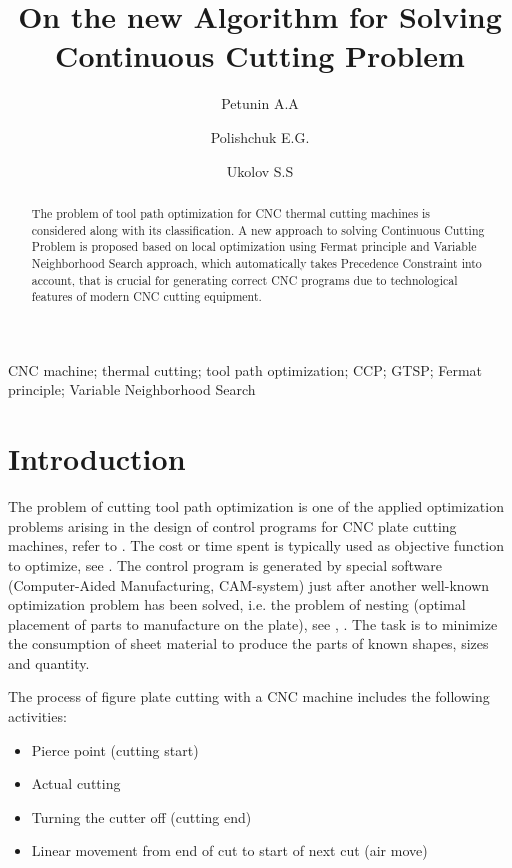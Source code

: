 \documentclass{ifacconf}
\begin{document}
\begin{frontmatter}

\title{On the new Algorithm for Solving Continuous Cutting Problem}

\author[urfu]{Petunin A.A}
\author[urfu]{Polishchuk E.G.}
\author[urfu]{Ukolov S.S}

\address[urfu]{Ural Federal University, Yekaterinburg, Russia}

\begin{abstract}                %
The problem of tool path optimization
for CNC thermal cutting machines is considered
along with its classification.
A new approach to solving
Continuous Cutting Problem
is proposed
based on local optimization
using Fermat principle
and Variable Neighborhood Search approach,
which automatically takes
Precedence Constraint into account,
that is crucial for generating
correct CNC programs
due to technological features
of modern CNC cutting equipment.
\end{abstract}

\begin{keyword}
CNC machine; thermal cutting;
tool path optimization;
CCP; GTSP;
Fermat principle;
Variable Neighborhood Search
\end{keyword}

\end{frontmatter}

\section{Introduction}

The problem of cutting tool path optimization
is one of the applied optimization problems arising
in the design of control programs for CNC plate cutting machines,
refer to \cite{Dewil2016Nov}.
The cost or time spent is typically used
as objective function to optimize,
see
\cite{Tavaeva2015Nov}.
The control program is generated by special software
(Computer-Aided Manufacturing, CAM-system)
just after another well-known optimization problem
has been solved,
i.e. the problem of nesting
(optimal placement of parts to manufacture on the plate),
see \cite{huang2009optimal},
\cite{sherif2014sequential}.
The task is to minimize the consumption of sheet material
to produce the parts of known shapes, sizes and quantity.

The process of figure plate cutting with a CNC machine includes
the following activities:
\begin{itemize}
    \item{Pierce point} (cutting start)
    \item{Actual cutting}
    \item{Turning the cutter off} (cutting end)
    \item{Linear movement from end of cut to start of next cut} (air move)
\end{itemize}
\end{document}
